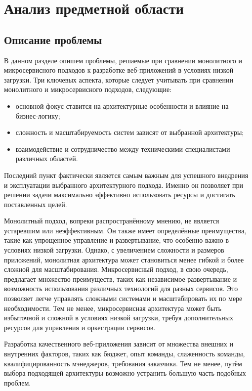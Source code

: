 \section{Анализ предметной области}

\subsection{Описание проблемы}
    В данном разделе опишем проблемы, решаемые при сравнении монолитного и микросервисного подходов к разработке веб-приложений в условиях низкой загрузки.
    Три ключевых аспекта, которые следует учитывать при сравнении монолитного и микросервисного подходов, следующие:
    \begin{itemize}
        \item основной фокус ставится на архитектурные особенности и влияние на бизнес-логику;
        \item сложность и масштабируемость систем зависят от выбранной архитектуры;
        \item взаимодействие и сотрудничество между техническими специалистами различных областей.
    \end{itemize}
    Последний пункт фактически является самым важным для успешного внедрения и эксплуатации выбранного архитектурного подхода. Именно он позволяет при решении задачи максимально эффективно использовать ресурсы и достигать поставленных целей.

    Монолитный подход, вопреки распространённому мнению, не является устаревшим или неэффективным. Он также имеет определённые преимущества, такие как упрощенное управление и развертывание, что особенно важно в условиях низкой загрузки. Однако, с увеличением сложности и размеров приложений, монолитная архитектура может становиться менее гибкой и более сложной для масштабирования. Микросервисный подход, в свою очередь, предлагает множество преимуществ, таких как независимое развертывание и возможность использования различных технологий для разных сервисов. Это позволяет легче управлять сложными системами и масштабировать их по мере необходимости. Тем не менее, микросервисная архитектура может быть избыточной и сложной в условиях низкой загрузки, требуя дополнительных ресурсов для управления и оркестрации сервисов.
    
    Разработка качественного веб-приложения зависит от множества внешних и внутренних факторов, таких как бюджет, опыт команды, слаженность команды, квалифицированность мэнеджеров, требования заказчика. Тем не менее, путём выбора подходящей архитектуры возможно устранить большую часть подобных проблем.

